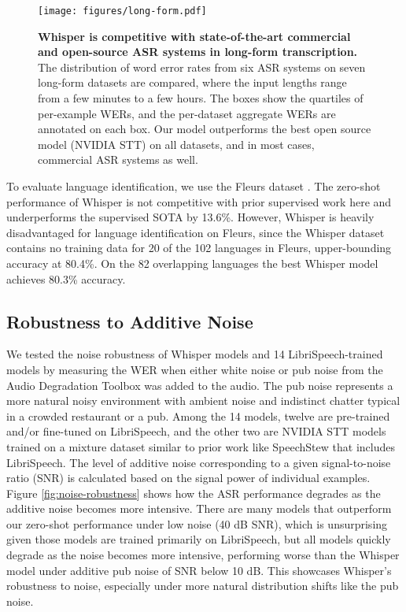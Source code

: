 \begin{figure*}[b]
\begin{center}
\centerline{\texttt{[image: figures/long-form.pdf]}}
\caption{\textbf{Whisper is competitive with state-of-the-art commercial and open-source ASR systems in long-form transcription.} The distribution of word error rates from six ASR systems on seven long-form datasets are compared, where the input lengths range from a few minutes to a few hours. The boxes show the quartiles of per-example WERs, and the per-dataset aggregate WERs are annotated on each box. Our model outperforms the best open source model (NVIDIA STT) on all datasets, and in most cases, commercial ASR systems as well.}
\label{fig:long-form}
\end{center}
\vspace{-1em}
\end{figure*}

To evaluate language identification, we use the Fleurs dataset \cite{conneau2022fleurs}. The zero-shot performance of Whisper is not competitive with prior supervised work here and underperforms the supervised SOTA by 13.6\%. However, Whisper is heavily disadvantaged for language identification on Fleurs, since the Whisper dataset contains no training data for 20 of the 102 languages in Fleurs, upper-bounding accuracy at 80.4\%. On the 82 overlapping languages the best Whisper model achieves 80.3\% accuracy.

\subsection{Robustness to Additive Noise}\label{subsec:noise-robustness}

We tested the noise robustness of Whisper models and 14 LibriSpeech-trained models by measuring the WER when either white noise or pub noise from the Audio Degradation Toolbox \cite{mauch2013adt} was added to the audio. The pub noise represents a more natural noisy environment with ambient noise and indistinct chatter typical in a crowded restaurant or a pub. Among the 14 models, twelve are pre-trained and/or fine-tuned on LibriSpeech, and the other two are NVIDIA STT models trained on a mixture dataset similar to prior work like SpeechStew that includes LibriSpeech.
The level of additive noise corresponding to a given signal-to-noise ratio (SNR) is calculated based on the signal power of individual examples.
Figure \ref{fig:noise-robustness} shows how the ASR performance degrades as the additive noise becomes more intensive. There are many models that outperform our zero-shot performance under low noise (40 dB SNR), which is unsurprising given those models are trained primarily on LibriSpeech, but all models quickly degrade as the noise becomes more intensive, performing worse than the Whisper model under additive pub noise of SNR below 10 dB. This showcases Whisper's robustness to noise, especially under more natural distribution shifts like the pub noise.

